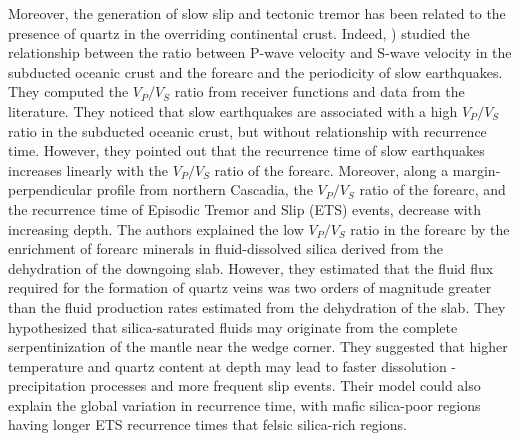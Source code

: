 \documentclass[draft]{agujournal2019}
\begin{document}
Moreover, the generation of slow slip and tectonic tremor has been related to the presence of quartz in the overriding continental crust. Indeed, ) studied the relationship between the ratio between P-wave velocity and S-wave velocity in the subducted oceanic crust and the forearc and the periodicity of slow earthquakes. They computed the $V_P / V_S$ ratio from receiver functions and data from the literature. They noticed that slow earthquakes are associated with a high $V_P / V_S$ ratio in the subducted oceanic crust, but without relationship with recurrence time. However, they pointed out that the recurrence time of slow earthquakes increases linearly with the $V_P / V_S$ ratio of the forearc. Moreover, along a margin-perpendicular profile from northern Cascadia, the $V_P / V_S$ ratio of the forearc, and the recurrence time of Episodic Tremor and Slip (ETS) events, decrease with increasing depth. The authors explained the low $V_P / V_S$ ratio in the forearc by the enrichment of forearc minerals in fluid-dissolved silica derived from the dehydration of the downgoing slab. However, they estimated that the fluid flux required for the formation of quartz veins was two orders of magnitude greater than the fluid production rates estimated from the dehydration of the slab. They hypothesized that silica-saturated fluids may originate from the complete serpentinization of the mantle near the wedge corner. They suggested that higher temperature and quartz content at depth may lead to faster dissolution - precipitation processes and more frequent slip events. Their model could also explain the global variation in recurrence time, with mafic silica-poor regions having longer ETS recurrence times that felsic silica-rich regions. \\
\end{document}
